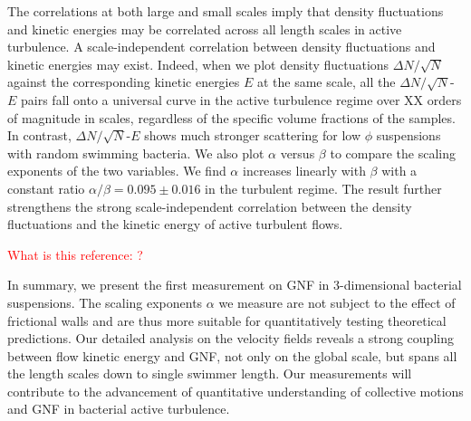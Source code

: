 \documentclass[twocolumn,aps,prl,amsmath,amssymb,longbibliography]{revtex4-2}
\begin{document}
The correlations at both large and small scales imply that density fluctuations and kinetic energies may be correlated across all length scales in active turbulence. A scale-independent correlation between density fluctuations and kinetic energies may exist. Indeed, when we plot density fluctuations $\Delta N/\sqrt N$ against the corresponding kinetic energies $E$ at the same scale, all the $\Delta N/\sqrt N$-$E$ pairs fall onto a universal curve in the active turbulence regime over XX orders of magnitude in scales, regardless of the specific volume fractions of the samples.
In contrast, $\Delta N/\sqrt N$-$E$ shows much stronger scattering for low $\phi$ suspensions with random swimming bacteria. We also plot $\alpha$ versus $\beta$ to compare the scaling exponents of the two variables. We find $\alpha$ increases linearly with $\beta$ with a constant ratio $\alpha/\beta = 0.095 \pm 0.016$ in the turbulent regime. The result further strengthens the strong scale-independent correlation between the density fluctuations and the kinetic energy of active turbulent flows.

\textcolor{red}{What is this reference: \cite{Chatterjee2019}?}






In summary, we present the first measurement on GNF in 3-dimensional bacterial suspensions. The scaling exponents $\alpha$ we measure are not subject to the effect of frictional walls and are thus more suitable for quantitatively testing theoretical predictions.
Our detailed analysis on the velocity fields reveals a strong coupling between flow kinetic energy and GNF, not only on the global scale, but spans all the length scales down to single swimmer length.
Our measurements will contribute to the advancement of quantitative understanding of collective motions and GNF in bacterial active turbulence.



\end{document}
